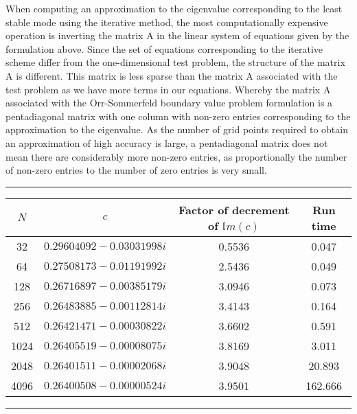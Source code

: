 \documentclass[a4paper, 12pt, twoside, openright]{article}
\numberwithin{equation}{section}
\begin{document}
When computing an approximation to the eigenvalue corresponding to the least stable mode using the iterative method, the most computationally expensive operation is inverting the matrix $\mathrm{A}$ in the linear system of equations given by the formulation above. Since the set of equations corresponding to the iterative scheme differ from the one-dimensional test problem, the structure of the matrix $\mathrm{A}$ is different. This matrix is less sparse than the matrix $\mathrm{A}$ associated with the test problem as we have more terms in our equations. Whereby the matrix $\mathrm{A}$ associated with the Orr-Sommerfeld boundary value problem formulation is a pentadiagonal matrix with one column with non-zero entries corresponding to the approximation to the eigenvalue. As the number of grid points required to obtain an approximation of high accuracy is large, a pentadiagonal matrix does not mean there are considerably more non-zero entries, as proportionally the number of non-zero entries to the number of zero entries is very small. 
\begin{table}[H]
\centering 
\rule{\linewidth}{1.5pt}
\bgroup
\def\arrarystretch{1.25}
\begin{tabular}{ c@{\qquad} c@{\qquad} c@{\qquad} c@{\qquad} }
$N$ & $c$ & Factor of decrement of $\mathbb{I}m(c)$ & Run time \\\hline
32 &  $0.29604092 - 0.03031998i$ & 0.5536  & 0.047 \\
64 &  $0.27508173 - 0.01191992i $ & 2.5436  &  0.049 \\
128 & $0.26716897 - 0.00385179i  $& 3.0946  & 0.073 \\
256 & $ 0.26483885 - 0.00112814i $& 3.4143  & 0.164 \\
512 & $ 0.26421471 - 0.00030822i $&  3.6602 & 0.591  \\ 
1024 & $ 0.26405519 - 0.00008075i $&  3.8169 & 3.011 \\
2048 & $ 0.26401511 - 0.00002068i $ & 3.9048  & 20.893 \\
4096 & $0.26400508 - 0.00000524i$ & 3.9501  & 162.666
\end{tabular}
\egroup %
\rule{\linewidth}{1.5pt}
\end{table}
 
\end{document}

